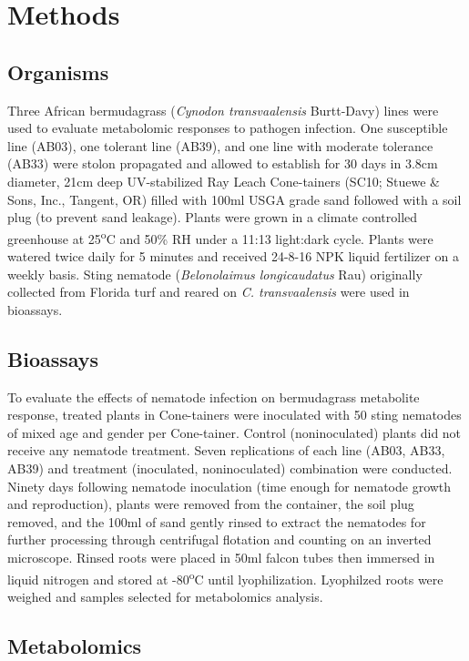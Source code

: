 \documentclass[fleqn,10pt]{wlscirep}
\begin{document}
\section*{Methods}

\subsection*{Organisms}

Three African bermudagrass (\textit{Cynodon transvaalensis} Burtt-Davy) lines were used to evaluate metabolomic responses to pathogen infection.  One susceptible line (AB03), one tolerant line (AB39), and one line with moderate tolerance (AB33) were stolon propagated and allowed to establish for 30 days in 3.8cm diameter, 21cm deep UV-stabilized Ray Leach Cone-tainers (SC10; Stuewe & Sons, Inc., Tangent, OR) filled with 100ml USGA grade sand followed with a soil plug (to prevent sand leakage). Plants were grown in a climate controlled greenhouse at 25\textsuperscript{o}C and 50\% RH under a 11:13 light:dark cycle.  Plants were watered twice daily for 5 minutes and received 24-8-16 NPK liquid fertilizer on a weekly basis.  Sting nematode (\textit{Belonolaimus longicaudatus} Rau) originally collected from Florida turf and reared on \textit{C. transvaalensis} were used in bioassays. 

\subsection*{Bioassays}

To evaluate the effects of nematode infection on bermudagrass metabolite response, treated plants in Cone-tainers were inoculated with 50 sting nematodes of mixed age and gender per Cone-tainer.  Control (noninoculated) plants did not receive any nematode treatment. Seven replications of each line (AB03, AB33, AB39) and treatment (inoculated, noninoculated) combination were conducted.  Ninety days following nematode inoculation (time enough for nematode growth and reproduction), plants were removed from the container, the soil plug removed, and the 100ml of sand gently rinsed to extract the nematodes for further processing through centrifugal flotation and counting on an inverted microscope.  Rinsed roots were placed in 50ml falcon tubes then immersed in liquid nitrogen and stored at -80\textsuperscript{o}C until lyophilization.  Lyophilzed roots were weighed and samples selected for metabolomics analysis. 

\subsection*{Metabolomics}
\end{document}

